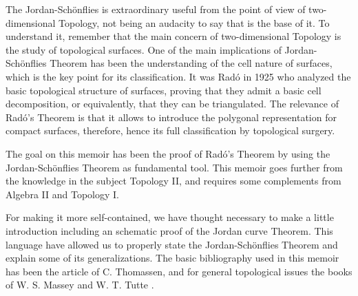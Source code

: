 \documentclass[12pt,a4paper,oldfontcommands]{memoir}
\begin{document}
The Jordan-Schönflies is extraordinary useful from the point of view of two-dimensional Topology, not being an audacity to say that is the base of it. To understand it, remember that the main concern of two-dimensional Topology is the study of topological surfaces. One of the main implications of Jordan-Schönflies Theorem has been the understanding of the cell nature of surfaces, which is the key point for  its classification. It was Radó in 1925 who analyzed the basic topological structure of surfaces, proving that they admit a basic cell  decomposition, or equivalently, that they can be triangulated. The relevance of Radó's Theorem  is that it allows to introduce the polygonal representation for compact surfaces, therefore, hence its full classification by topological surgery.

The goal on this memoir has been the proof of Radó's Theorem by using the Jordan-Schönflies Theorem as fundamental tool. This  memoir goes further from the knowledge  in the subject Topology II, and  requires some complements from Algebra II and Topology I. 

For  making it more self-contained, we have thought necessary to make a little introduction including an schematic proof of the Jordan curve Theorem. This language have allowed us to properly state the Jordan-Schönflies Theorem and explain some of its generalizations. The basic bibliography   used in this memoir has been  the article of C. Thomassen, \cite{Thomassen} and for general topological issues the books of W. S. Massey \cite{Massey} and W. T. Tutte \cite{Tutte}.
\end{document}
